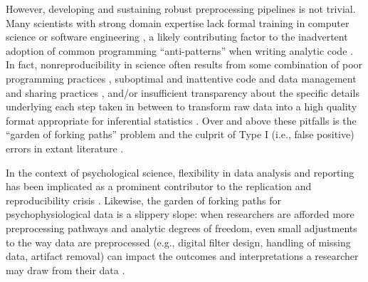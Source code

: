 However, developing and sustaining robust preprocessing pipelines is not trivial. Many scientists with strong domain expertise lack formal training in computer science or software engineering \parencite{chen2025exploring,segal2008scientists}, a likely contributing factor to the inadvertent adoption of common programming ``anti-patterns'' when writing analytic code \parencite{wilson2014best}. In fact, nonreproducibility in science often results from some combination of poor programming practices \parencite{hatton1997texperiments,hatton1994accurate,merali2010error,miller2006scientists}, suboptimal and inattentive code and data management and sharing practices \parencite{frank2025replication,gorgolewski2016practical,kovacs2024opening}, and/or insufficient transparency about the specific details underlying each step taken in between to transform raw data into a high quality format appropriate for inferential statistics \parencite{poldrack2019computational}. Over and above these pitfalls is the ``garden of forking paths'' problem and the culprit of Type I (i.e., false positive) errors in extant literature \parencite{gelman2013garden,poldrack2017scanning,simmons2011false}.

In the context of psychological science, flexibility in data analysis and reporting has been implicated as a prominent contributor to the replication and reproducibility crisis \parencite{hardwicke2021analytic,hardwicke2018data,hardwicke2022estimating,ioannidis2005why,osc2015estimating}. Likewise, the garden of forking paths for psychophysiological data is a slippery slope: when researchers are afforded more preprocessing pathways and analytic degrees of freedom, even small adjustments to the way data are preprocessed (e.g., digital filter design, handling of missing data, artifact removal) can impact the outcomes and interpretations a researcher may draw from their data \parencite{soskic2024garden}.

